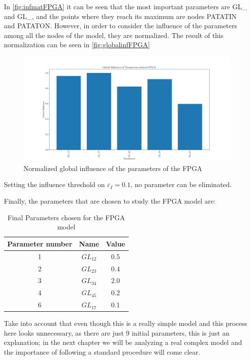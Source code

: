  In \autoref{fig:infmatFPGA} it can be seen that the most important parameters are GL\_ and GL\_, and the points where they reach its maximum are nodes PATATIN and PATATON. However, in order to consider the influence of the parameters among all the nodes of the model, they are normalized. The result of this normalization can be seen in \autoref{fig:globalinfFPGA}

 \begin{figure}[H]
     \centering
     \includegraphics[scale=0.5]{Figures/FPGA/FPGA-redinfglobal.png}
     \caption{Normalized global influence of the parameters of the FPGA}
     \label{fig:globalinfFPGA}
 \end{figure}

 Setting the influence threshold on $\varepsilon_I = 0.1$, no parameter can be eliminated. 

 Finally, the parameters that are chosen to study the FPGA model are:
 \begin{table}[H]
    \centering
    \caption{Final Parameters chosen for the FPGA model}
    \label{tab:finalparamsFPGA}
    
    \begin{tabular}{c c c}
    \toprule
    \multicolumn{1}{c}{\textbf{Parameter number}} & \multicolumn{1}{c}{\textbf{Name}} & \multicolumn{1}{c}{\textbf{Value}} \\ \midrule
    1 & $GL_{12}$ & 0.5 \\
    2 & $GL_{23}$ & 0.4 \\
    3 & $GL_{34}$ & 2.0 \\
    4 & $GL_{45}$ & 0.2 \\
    6 & $GL_{17}$ & 0.1 \\
     \bottomrule  
    \end{tabular}
    \end{table}

 Take into account that even though this is a really simple model and this process here looks unnecessary, as there are just 9 initial parameters, this is just an explanation; in the next chapter we will be analyzing a real complex model and the importance of following a standard procedure will come clear.




















